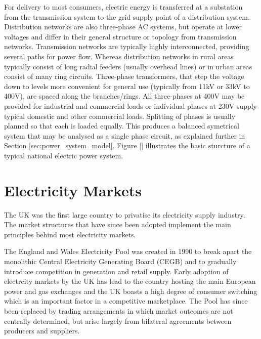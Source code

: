 For delivery to most consumers, electric energy is transferred at a substation
from the transmission system to the grid supply point of a distribution
system.  Distribution networks are also three-phase AC systems, but operate at
lower voltages and differ in their general structure or topology from
transmission networks.  Transmission networks are typically highly
interconnected, providing several paths for power flow.  Whereas distribution
networks in rural areas typically consist of long radial feeders (usually
overhead lines) or in urban areas consist of many ring circuits.  Three-phase
transformers, that step the voltage down to levels more convenient for general
use (typically from 11kV or 33kV to 400V), are spaced along the branches/rings.
All three-phases at 400V may be provided for industrial and commercial loads
or individual phases at 230V supply typical domestic and other commercial
loads. Splitting of phases is usually planned so that each is loaded equally.
This produces a balanced symetrical system that may be analysed as a single
phase circuit, as explained further in Section \ref{sec:power_system_model}.
Figure [] illustrates the basic sturcture of a typical national electric power
system.

\section{Electricity Markets}
The UK was the first large country to privatise its electricity
supply industry.  The market structures that have since been adopted
implement the main principles behind most electricity markets.

The England and Wales Electricity Pool was created in 1990 to break apart the
monolithic Central Electricity Generating Board (CEGB) and to gradually
introduce competition in generation and retail supply.  Early adoption of
electrcity markets by the UK has lead to the country hosting the
main European power and gas exchanges and the UK boasts a high degree
of consumer switching which is an important factor in a competitive
marketplace. The Pool has since been replaced by trading arrangements in which
market outcomes are not centrally determined, but arise largely from
bilateral agreements between producers and suppliers.


